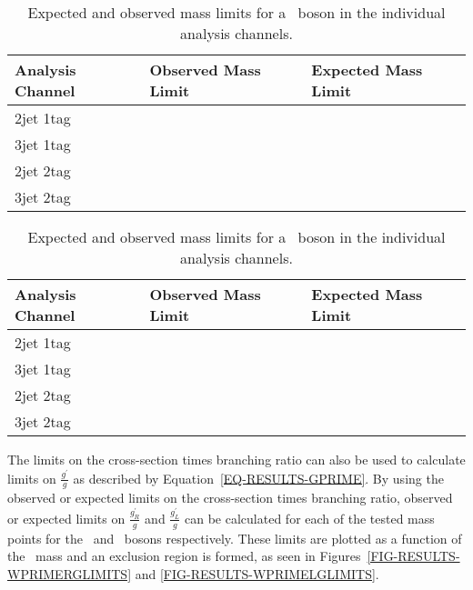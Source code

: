 

\begin{table}
\begin{center}
\begin{tabular}{|l|l|l|}
\hline
Analysis Channel & Observed Mass Limit & Expected Mass Limit\\
\hline
2jet 1tag & & \\
3jet 1tag & & \\
2jet 2tag & & \\
3jet 2tag & & \\
\hline
\end{tabular}
\caption{Expected and observed mass limits for a \WprimeR\ boson in the individual analysis channels.}
\label{TABLE-RESULTS-WPRIMERLIMITS}
\end{center}
\end{table}

\begin{table}
\begin{center}
\begin{tabular}{|l|l|l|}
\hline
Analysis Channel & Observed Mass Limit & Expected Mass Limit\\
\hline
2jet 1tag & & \\
3jet 1tag & & \\
2jet 2tag & & \\
3jet 2tag & & \\
\hline
\end{tabular}
\caption{Expected and observed mass limits for a \WprimeL\ boson in the individual analysis channels.}
\label{TABLE-RESULTS-WPRIMELLIMITS}
\end{center}
\end{table}

The limits on the cross-section times branching ratio can also be used to calculate limits on $\frac{g^\prime}{g}$ as described by Equation~\ref{EQ-RESULTS-GPRIME}. By using the observed or expected limits on the cross-section times branching ratio, observed or expected limits on $\frac{g^\prime_R}{g}$ and $\frac{g^\prime_L}{g}$ can be calculated for each of the tested mass points for the \WprimeR\ and \WprimeL\ bosons respectively. These limits are plotted as a function of the \Wprime\ mass and an exclusion region is formed, as seen in Figures~\ref{FIG-RESULTS-WPRIMERGLIMITS} and \ref{FIG-RESULTS-WPRIMELGLIMITS}.

